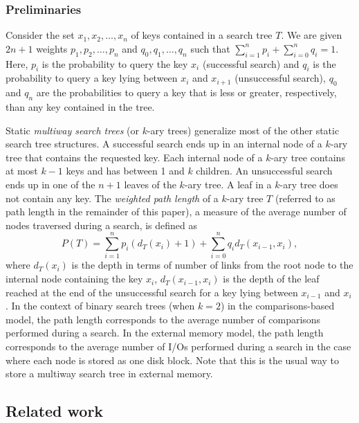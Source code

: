 \documentclass{llncs}\usepackage[english]{babel}
\begin{document}
\subsubsection*{Preliminaries}

Consider the set $x_1,x_2,\ldots,x_n$ of keys contained in a search tree $T$. We are given $2n+1$ weights $p_1,p_2,\ldots,p_n$ and $q_0,q_1,\dots,q_n$ such that $\sum_{i=1}^n p_i+\sum_{i=0}^n q_i=1$. Here, $p_i$ is the probability to query the key $x_i$ (successful search) and $q_i$ is the probability to query a key lying between $x_i$ and $x_{i+1}$ (unsuccessful search), $q_0$ and $q_n$ are the probabilities to query a key that is less or greater, respectively, than any key contained in the tree. 

Static \emph{multiway search trees} (or $k$-ary trees) generalize most of the other static search tree structures. A successful search ends up in an internal node of a $k$-ary tree that contains the requested key. Each internal node of a $k$-ary tree contains at most $k-1$ keys and has between 1 and $k$ children. An unsuccessful search ends up in one of the $n+1$ leaves of the $k$-ary tree. A leaf in a $k$-ary tree does not contain any key. The \emph{weighted path length} of a $k$-ary tree $T$ (referred to as path length in the remainder of this paper), a measure of the average number of nodes traversed during a search, is defined as 
\begin{equation}
\label{PL}
P(T)=\sum_{i=1}^n p_i (d_T(x_i)+1) + \sum_{i=0}^n q_i d_T(x_{i-1},x_{i}),
\end{equation}
where $d_T(x_i)$ is the depth in terms of number of links from the root node to the internal node containing the key $x_i$, $d_T(x_{i-1},x_{i})$ is the depth of the leaf reached at the end of the unsuccessful search for a key lying between $x_{i-1}$ and $x_i$. In the context of binary search trees (when $k=2$) in the comparisons-based model, the path length corresponds to the average number of comparisons performed during a search. In the external memory model, the path length corresponds to the average number of I/Os performed during a search in the case where each node is stored as one disk  block. Note that this is the usual way to store a multiway search tree in external memory. 

\subsection{Related work}
\end{document}
